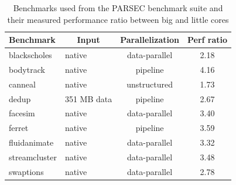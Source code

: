 

\begin{table}[!t]
	\centering
	\scriptsize
	\caption{Benchmarks used from the PARSEC benchmark suite and their 
		measured performance ratio between big and little cores}
	\setlength{\tabcolsep}{3pt}
	\begin{tabular}{|p{2cm}|p{2.5cm}|c|c|}
		\hline
		\textbf{Benchmark} & \multicolumn{1}{|c|}{\textbf{Input}} & \textbf{Parallelization} & \multicolumn{1}{|c|}{\textbf{Perf ratio}} \\
		\hline \hline
		blackscholes & native & data-parallel &2.18 \\ \hline
		bodytrack & native & pipeline & 4.16 \\ \hline
		canneal & native & unstructured & 1.73 \\ \hline
		dedup & 351 MB data & pipeline & 2.67 \\ \hline
		facesim & native & data-parallel & 3.40 \\ \hline
		ferret & native & pipeline & 3.59 \\ \hline
		fluidanimate & native & data-parallel & 3.32 \\ \hline
		streamcluster & native & data-parallel & 3.48 \\ \hline
		swaptions & native & data-parallel & 2.78 \\ \hline
	\end{tabular}
	\label{tab:parsec}
\end{table}

